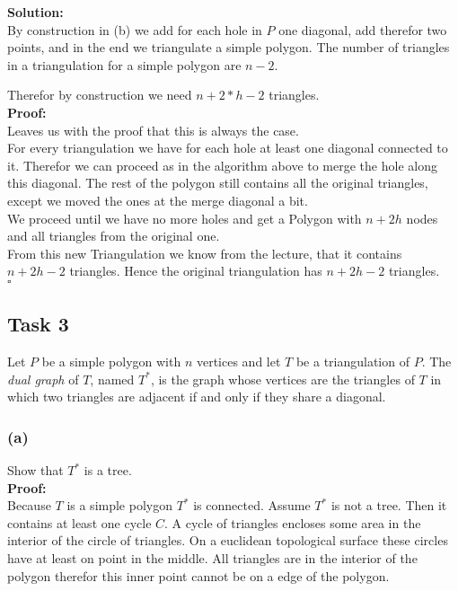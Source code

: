 \documentclass[11pt,a4paper,ngerman]{article}
\begin{document}
\textbf{Solution:}\\

By construction in (b) we add for each hole in $P$ one diagonal, add therefor two points, and in the end we triangulate a simple polygon.
The number of triangles in a triangulation for a simple polygon are $n-2$.

Therefor by construction we need $n + 2*h -2$ triangles.\\

\textbf{Proof:}\\
Leaves us with the proof that this is always the case.\\
For every triangulation we have for each hole at least one diagonal connected to it. Therefor we can proceed as in the
algorithm above to merge the hole along this diagonal. The rest of the polygon still contains all the original triangles,
except we moved the ones at the merge diagonal a bit.\\

We proceed until we have no more holes and get a Polygon with $n + 2h$ nodes and all triangles from the original one.\\
From this new Triangulation we know from the lecture, that it contains $n + 2h -2$ triangles. Hence the original
triangulation has $n + 2h - 2$ triangles.\\
\mbox{} \hfill $\square$

\subsection*{Task 3}

Let $P$ be a simple polygon with $n$ vertices and let $T$ be a triangulation of $P$. The \emph{dual graph} of $T$,
named $T^*$, is the graph whose vertices are the triangles of $T$ in which two triangles are adjacent if and only if
they share a diagonal.

\subsubsection*{(a)}
Show that $T^*$ is a tree.\\

\textbf{Proof:}\\

Because $T$ is a simple polygon $T^*$ is connected. Assume $T^*$ is not a tree. Then it contains at least one
cycle $C$. A cycle of triangles encloses some area in the interior of the circle of triangles. On a euclidean
topological surface these circles have at least on point in the middle. All triangles are in the interior of the polygon
therefor this inner point cannot be on a edge of the polygon.
\end{document}
